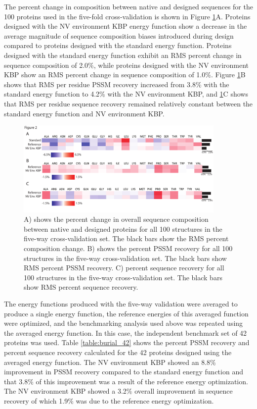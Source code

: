 The percent change in composition between native and designed sequences for the 100 proteins used in the five-fold cross-validation is shown in Figure \ref{fig:overall_crossval_changes}A.
Proteins designed with the \ac{NV} environment \ac{KBP} energy function show a decrease in the average magnitude of sequence composition biases introduced during design compared to proteins designed with the standard energy function.
Proteins designed with the standard energy function exhibit an \ac{RMS} percent change in sequence composition of 2.0\%, while proteins designed with the \ac{NV} environment \ac{KBP} show an \ac{RMS} percent change in sequence composition of 1.0\%.
Figure \ref{fig:overall_crossval_changes}B shows that \ac{RMS} per residue \ac{PSSM} recovery increased from 3.8\% with the standard energy function to 4.2\% with the \ac{NV} environment \ac{KBP}, and \ref{fig:overall_crossval_changes}C shows that \ac{RMS} per residue sequence recovery remained relatively constant between the standard energy function and \ac{NV} environment \ac{KBP}. 

\begin{figure}
\centering
\includegraphics[width=4in]{figures/nv_kbp/overall_crossval_changes}
\caption{
A) shows the percent change in overall sequence composition between native and designed proteins for all 100 structures in the five-way cross-validation set.
The black bars show the \acs{RMS} percent composition change.
B) shows the percent \acs{PSSM} recovery for all 100 structures in the five-way cross-validation set.  The black bars show \acs{RMS} percent \acs{PSSM} recovery.
C) percent sequence recovery for all 100 structures in the five-way cross-validation set.  The black bars show \acs{RMS} percent sequence recovery.	
}
\label{fig:overall_crossval_changes}
\end{figure}


The energy functions produced with the five-way validation were averaged to produce a single energy function, the reference energies of this averaged function were optimized, and the benchmarking analysis used above was repeated using the averaged energy function.
In this case, the independent benchmark set of 42 proteins was used.
Table \ref{table:burial_42} shows the percent \ac{PSSM} recovery and percent sequence recovery calculated for the 42 proteins designed using the averaged energy function.
The \ac{NV} environment \ac{KBP} showed an 8.8\% improvement in \ac{PSSM} recovery compared to the standard energy function and that 3.8\% of this improvement was a result of the reference energy optimization.
The \ac{NV} environment \ac{KBP} showed a 3.2\% overall improvement in sequence recovery of which 1.9\% was due to the reference energy optimization. 

